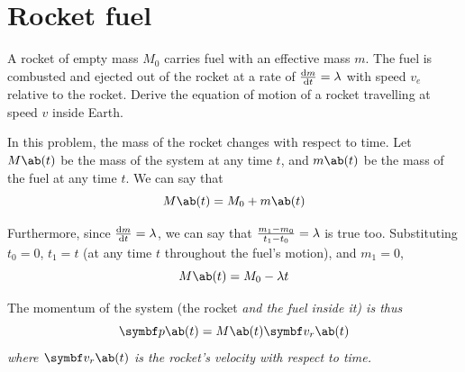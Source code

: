 \section{Rocket fuel}
\begin{problem}
  A rocket of empty mass \(M_0\) carries fuel with an effective mass \(m\).
  The fuel is combusted and ejected out of the rocket at a rate of
  \(\odv{m}{t} = \lambda\)
  with speed \(v_e\) relative to the rocket. Derive the equation of
  motion of a rocket travelling at speed \(v\) inside
  Earth.
\end{problem}

In this problem, the mass of the rocket changes with respect to time.
Let \(M\ab(t)\) be the mass
of the system at any time \(t\), and \(m\ab(t)\) be the mass of the fuel at any
time \(t\).
We can say that
\begin{equation}
  M\ab(t) = M_0 + m\ab(t)
\end{equation}

Furthermore, since \(\odv{m}{t}=\lambda\), we can say that
\(\frac{m_1 - m_0}{t_1-t_0}=\lambda\) is true too. Substituting \(t_0 = 0\),
\(t_1 = t\) (at any time \(t\) throughout the fuel's motion), and \(m_1 = 0\),
\begin{equation}
  M\ab(t) = M_0 - \lambda t
  \label{eq:systemmass}
\end{equation}

The momentum of the system (the rocket \it{and} the fuel inside it) is thus
\begin{equation}
  \mv{p}\ab(t) = M\ab(t)\mv{v}_r\ab(t)
  \label{eq:sysp}
\end{equation}
where \(\mv{v}_r\ab(t)\) is the rocket's velocity with respect to time.

